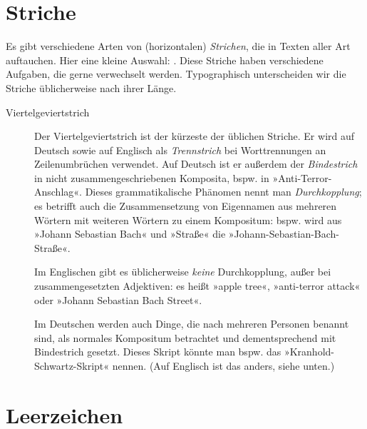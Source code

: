 \section{Striche}

Es gibt verschiedene Arten von (horizontalen) \emph{Strichen}, die in
Texten aller Art auftauchen.  Hier eine kleine Auswahl:
\Char{-\,--\,---\,$-$\,$=$}.  Diese Striche haben verschiedene
Aufgaben, die gerne verwechselt werden.  Typographisch unterscheiden
wir die Striche üblicherweise nach ihrer Länge.

\begin{description}
\item[Viertelgeviertstrich] Der Viertelgeviertstrich \Char{-} ist der
  kürzeste der üblichen Striche.  Er wird auf Deutsch sowie auf
  Englisch als \emph{Trennstrich} bei Worttrennungen an
  Zeilenumbrüchen verwendet.  Auf Deutsch ist er außerdem der
  \emph{Bindestrich} in nicht zusammengeschriebenen Komposita,
  bspw. in »Anti-Terror-Anschlag«.  Dieses grammatikalische Phänomen
  nennt man \emph{Durchkopplung}; es betrifft auch die Zusammensetzung
  von Eigennamen aus mehreren Wörtern mit weiteren Wörtern zu einem
  Kompositum: bspw. wird aus »Johann Sebastian Bach« und »Straße« die
  »Johann-Sebastian-Bach-Straße«.

  Im Englischen gibt es üblicherweise \emph{keine} Durchkopplung,
  außer bei zusammengesetzten Adjektiven: es heißt »apple tree«,
  »anti-terror attack« oder »Johann Sebastian Bach Street«.

  Im Deutschen werden auch Dinge, die nach mehreren Personen benannt
  sind, als normales Kompositum betrachtet und dementsprechend mit
  Bindestrich gesetzt.  Dieses Skript könnte man bspw. das
  »Kranhold-Schwartz-Skript« nennen.  (Auf Englisch ist das anders,
  siehe unten.)
\end{description}

\section{Leerzeichen}

